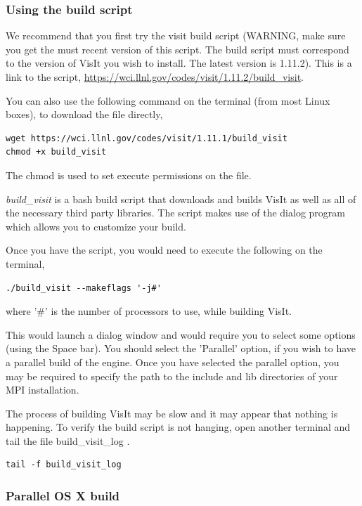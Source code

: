 \documentclass[12pt]{article}
\begin{document}
\subsubsection{Using the build script}
\label{subsec:UsingTheBuildScript}

We recommend that you first try the visit build script (WARNING, make
sure you get the must recent version of this script. The build script
must correspond to the version of VisIt you wish to install. The
latest version is 1.11.2). This is a link to the script,
\url{https://wci.llnl.gov/codes/visit/1.11.2/build\_visit}.

You can also use the following command on the terminal (from most
Linux boxes), to download the file directly,

\begin{verbatim}
wget https://wci.llnl.gov/codes/visit/1.11.1/build_visit
chmod +x build_visit
\end{verbatim}
The chmod is used to set execute permissions on the file.

\emph{build\_visit} is a bash build script that downloads and builds VisIt as
well as all of the necessary third party libraries. The script makes
use of the dialog program which allows you to customize your build.

Once you have the script, you would need to execute the following on
the terminal,

\begin{verbatim}
./build_visit --makeflags '-j#'
\end{verbatim}
where '\#' is the number of processors to use, while building VisIt.

This would launch a dialog window and would require you to select some
options (using the Space bar). You should select the 'Parallel'
option, if you wish to have a parallel build of the engine. Once you
have selected the parallel option, you may be required to specify the
path to the include and lib directories of your MPI installation.

The process of building VisIt may be slow and it may appear that
nothing is happening. To verify the build script is not hanging, open
another terminal and tail the file build\_visit\_log .

\begin{verbatim}
tail -f build_visit_log
\end{verbatim}

\normalfont  
\subsubsection{Parallel OS X build}
\label{sec:ParallelOSXBuild}
\end{document}

